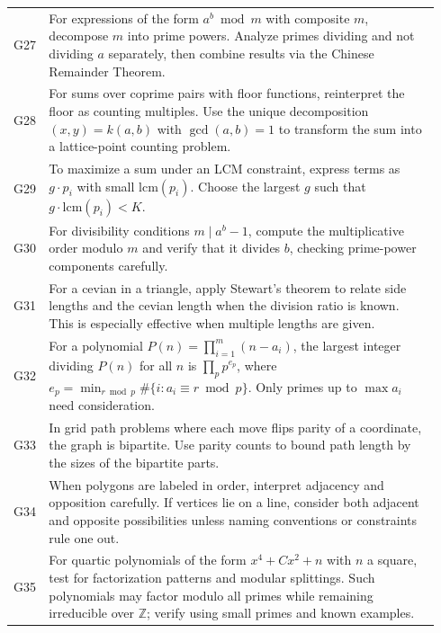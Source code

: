 \documentclass{article}
\theoremstyle{plain}
\theoremstyle{definition}
\theoremstyle{remark}
\begin{document}
\begin{table}[t]
\begin{tabular}{p{0.04\linewidth} p{0.9\linewidth}}
G27 & For expressions of the form \(a^b \bmod m\) with composite \(m\), decompose \(m\) into prime powers. Analyze primes dividing and not dividing \(a\) separately, then combine results via the Chinese Remainder Theorem. \\

G28 & For sums over coprime pairs with floor functions, reinterpret the floor as counting multiples. Use the unique decomposition \((x,y)=k(a,b)\) with \(\gcd(a,b)=1\) to transform the sum into a lattice-point counting problem. \\

G29 & To maximize a sum under an LCM constraint, express terms as \(g\cdot p_i\) with small \(\mathrm{lcm}(p_i)\). Choose the largest \(g\) such that \(g\cdot \mathrm{lcm}(p_i) < K\). \\

G30 & For divisibility conditions \(m \mid a^b - 1\), compute the multiplicative order modulo \(m\) and verify that it divides \(b\), checking prime-power components carefully. \\

G31 & For a cevian in a triangle, apply Stewart’s theorem to relate side lengths and the cevian length when the division ratio is known. This is especially effective when multiple lengths are given. \\

G32 & For a polynomial \(P(n)=\prod_{i=1}^m (n-a_i)\), the largest integer dividing \(P(n)\) for all \(n\) is \(\prod_p p^{e_p}\), where \(e_p=\min_{r\bmod p}\#\{i:a_i\equiv r\bmod p\}\). Only primes up to \(\max a_i\) need consideration. \\

G33 & In grid path problems where each move flips parity of a coordinate, the graph is bipartite. Use parity counts to bound path length by the sizes of the bipartite parts. \\

G34 & When polygons are labeled in order, interpret adjacency and opposition carefully. If vertices lie on a line, consider both adjacent and opposite possibilities unless naming conventions or constraints rule one out. \\

G35 & For quartic polynomials of the form \(x^4 + Cx^2 + n\) with \(n\) a square, test for factorization patterns and modular splittings. Such polynomials may factor modulo all primes while remaining irreducible over \(\mathbb{Z}\); verify using small primes and known examples. \\
\bottomrule
\end{tabular}
\end{table}
\end{document}
